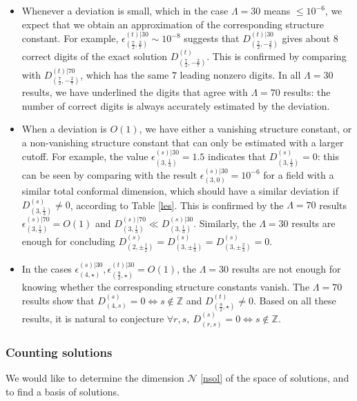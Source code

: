 \documentclass[12pt, a4paper]{article}
\begin{document}
\begin{itemize}
 \item
 Whenever a deviation is small, which in the case $\Lambda=30$ means $\leq 10^{-6}$, we expect that we obtain an approximation of the corresponding structure constant. For example, $\epsilon_{(\frac72,\frac27)}^{(t)|30}\sim 10^{-8}$ suggests that $D_{(\frac72,-\frac27)}^{(t)|30}$ gives about $8$ correct digits of the exact solution $D_{(\frac72,-\frac27)}^{(t)}$. This is confirmed by comparing with $D_{(\frac72,-\frac27)}^{(t)|70}$, which has the same $7$ leading nonzero digits. In all $\Lambda = 30$ results, we have underlined the digits that agree with $\Lambda = 70$ results: the number of correct digits is always accurately estimated by the deviation.
 \item
 When a deviation is $O(1)$, we have either a vanishing structure constant, or a non-vanishing structure constant that can only be estimated with a larger cutoff.
 For example, the value $\epsilon^{(s)|30}_{(3,\frac13)}=1.5$ indicates that $D^{(s)}_{(3,\frac13)}=0$: this can be seen by comparing with the result $\epsilon^{(s)|30}_{(3,0)}=10^{-6}$
for a field with a similar total conformal dimension, which should have a similar deviation if $D^{(s)}_{(3,\frac13)}\neq 0$,  according to Table \eqref{les}. This is confirmed by the $\Lambda = 70$ results $\epsilon_{(3,\frac13)}^{(s)|70} = O(1)$ and $D_{(3,\frac13)}^{(s)|70} \ll D_{(3,\frac13)}^{(s)|30}$.
 Similarly, the $\Lambda = 30$ results are enough for concluding $D^{(s)}_{(2,\pm\frac12)} =D^{(s)}_{(3,\pm \frac13)} = D^{(s)}_{(3,\pm \frac23)}=0$.
 \item
 In the cases $\epsilon^{(s)|30}_{(4,\star )},\epsilon^{(t)|30}_{(\frac92,\star)} = O(1)$, the $\Lambda =30$ results are not enough for knowing whether the corresponding structure constants vanish. The $\Lambda =70$ results show that $D^{(s)}_{(4,s)} = 0 \iff s \notin \mathbb{Z}$ and $D^{(t)}_{(\frac92,\star)} \neq 0$. Based on all these results, it is natural to conjecture $\forall r,s,\ D^{(s)}_{(r,s)} = 0 \iff s \notin \mathbb{Z}$.
\end{itemize}


\subsubsection{Counting solutions}

We would like to determine the dimension $\mathcal{N}$ \eqref{nsol} of the space of solutions, and to find a basis of solutions. 
\end{document}
